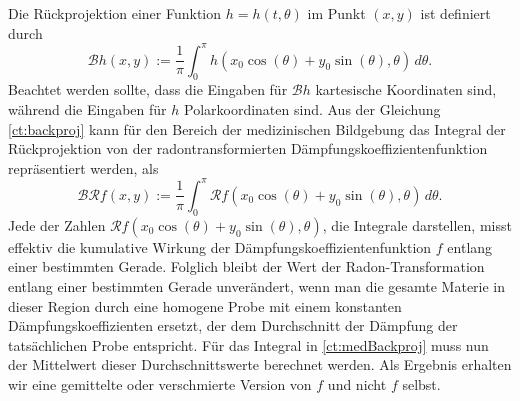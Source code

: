 Die Rückprojektion einer Funktion $h = h(t, \theta)$ im Punkt $(x, y)$ ist definiert durch
\begin{equation}\label{ct:backproj}
	\mathscr{B}h(x, y) := \dfrac{1}{\pi}\int_{0}^{\pi} h(x_0\cos(\theta) + y_0\sin(\theta), \theta) \,d\theta.
\end{equation}
Beachtet werden sollte, dass die Eingaben für $\mathscr{B}h$ kartesische Koordinaten sind, während die Eingaben für $h$ Polarkoordinaten sind.
Aus der Gleichung \eqref{ct:backproj} kann für den Bereich der medizinischen Bildgebung das Integral der Rückprojektion von der radontransformierten Dämpfungskoeffizientenfunktion repräsentiert werden, als
\begin{equation}\label{ct:medBackproj}
	\mathscr{B}\mathscr{R}f(x, y) := \dfrac{1}{\pi}\int_{0}^{\pi} \mathscr{R}f(x_0\cos(\theta) + y_0\sin(\theta), \theta) \,d\theta.
\end{equation}
Jede der Zahlen $\mathscr{R}f(x_0\cos(\theta) + y_0\sin(\theta), \theta)$, die Integrale darstellen, misst effektiv die kumulative Wirkung der Dämpfungskoeffizientenfunktion $f$ entlang einer bestimmten Gerade. Folglich bleibt der Wert der Radon-Transformation entlang einer bestimmten Gerade unverändert, wenn man die gesamte Materie in dieser Region durch eine homogene Probe mit einem konstanten Dämpfungskoeffizienten ersetzt, der dem Durchschnitt der Dämpfung der tatsächlichen Probe entspricht. Für das Integral in \eqref{ct:medBackproj} muss nun der Mittelwert dieser Durchschnittswerte berechnet werden. Als Ergebnis erhalten wir eine \glqq gemittelte\grqq{} oder \glqq verschmierte\grqq{} Version von $f$ und nicht $f$ selbst.

